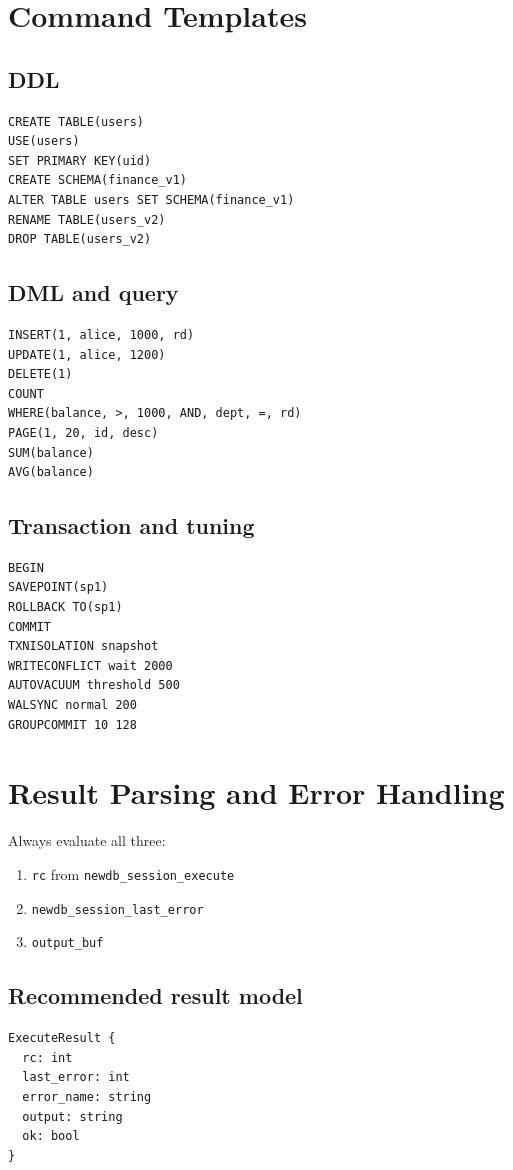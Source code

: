 \documentclass[11pt,a4paper]{article}
\begin{document}
\section{Command Templates}
\subsection{DDL}
\begin{lstlisting}
CREATE TABLE(users)
USE(users)
SET PRIMARY KEY(uid)
CREATE SCHEMA(finance_v1)
ALTER TABLE users SET SCHEMA(finance_v1)
RENAME TABLE(users_v2)
DROP TABLE(users_v2)
\end{lstlisting}

\subsection{DML and query}
\begin{lstlisting}
INSERT(1, alice, 1000, rd)
UPDATE(1, alice, 1200)
DELETE(1)
COUNT
WHERE(balance, >, 1000, AND, dept, =, rd)
PAGE(1, 20, id, desc)
SUM(balance)
AVG(balance)
\end{lstlisting}

\subsection{Transaction and tuning}
\begin{lstlisting}
BEGIN
SAVEPOINT(sp1)
ROLLBACK TO(sp1)
COMMIT
TXNISOLATION snapshot
WRITECONFLICT wait 2000
AUTOVACUUM threshold 500
WALSYNC normal 200
GROUPCOMMIT 10 128
\end{lstlisting}

\section{Result Parsing and Error Handling}
Always evaluate all three:
\begin{enumerate}
  \item \texttt{rc} from \texttt{newdb\_session\_execute}
  \item \texttt{newdb\_session\_last\_error}
  \item \texttt{output\_buf}
\end{enumerate}

\subsection{Recommended result model}
\begin{lstlisting}
ExecuteResult {
  rc: int
  last_error: int
  error_name: string
  output: string
  ok: bool
}
\end{lstlisting}
\end{document}
